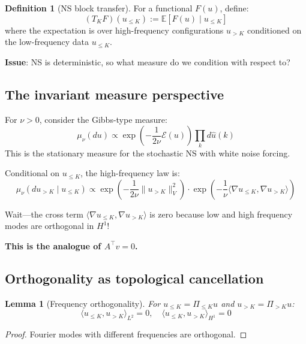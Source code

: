 \documentclass[11pt]{article}
\newtheorem{lemma}[theorem]{Lemma}
\theoremstyle{definition}
\newtheorem{definition}[theorem]{Definition}
\newcommand{\E}{\mathbb{E}}
\newcommand{\ip}[2]{\langle #1, #2 \rangle}
\begin{document}
\begin{definition}[NS block transfer]
For a functional $F(u)$, define:
\begin{equation}
(T_K F)(u_{\leq K}) := \E[F(u) \mid u_{\leq K}]
\end{equation}
where the expectation is over high-frequency configurations $u_{>K}$ conditioned on 
the low-frequency data $u_{\leq K}$.
\end{definition}

\textbf{Issue}: NS is deterministic, so what measure do we condition with respect to?

\subsection{The invariant measure perspective}

For $\nu > 0$, consider the Gibbs-type measure:
\begin{equation}
\mu_\nu(du) \propto \exp\left(-\frac{1}{2\nu}\mathcal{E}(u)\right) \prod_k d\hat{u}(k)
\end{equation}
This is the stationary measure for the stochastic NS with white noise forcing.

Conditional on $u_{\leq K}$, the high-frequency law is:
\begin{equation}
\mu_\nu(du_{>K} \mid u_{\leq K}) \propto \exp\left(-\frac{1}{2\nu}\|u_{>K}\|_V^2\right) 
\cdot \exp\left(-\frac{1}{\nu}\ip{\nabla u_{\leq K}}{\nabla u_{>K}}\right)
\end{equation}

Wait---the cross term $\ip{\nabla u_{\leq K}}{\nabla u_{>K}}$ is zero because low and high 
frequency modes are orthogonal in $H^1$!

\textbf{This is the analogue of $A^\top v = 0$.}

\subsection{Orthogonality as topological cancellation}

\begin{lemma}[Frequency orthogonality]
For $u_{\leq K} = \Pi_{\leq K} u$ and $u_{>K} = \Pi_{>K} u$:
\begin{equation}
\ip{u_{\leq K}}{u_{>K}}_{L^2} = 0, \quad \ip{u_{\leq K}}{u_{>K}}_{H^1} = 0
\end{equation}
\end{lemma}

\begin{proof}
Fourier modes with different frequencies are orthogonal.
\end{proof}
\end{document}
